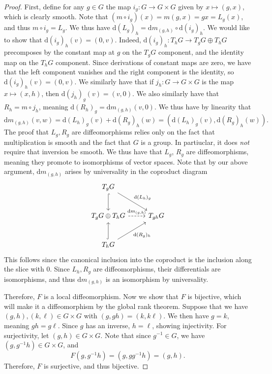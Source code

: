 \documentclass[11pt, letterpaper]{article}
\theoremstyle{plain}
\begin{document}
\begin{proof}
	First, define for any $g\in G$ the map $i_g : G \to G\times G$ given by $x\mapsto (g,x)$, which is clearly smooth. Note that $(m\circ i_g)(x)=m(g,x)=gx=L_g(x)$, and thus $m\circ i_g=L_g$. We thus have $\mathrm{d}(L_g)_h = \mathrm{d}m_{(g,h)} \circ \mathrm{d}(i_g)_h$. We would like to show that $\mathrm{d} (i_g)_h(v) = (0,v)$. Indeed, $\mathrm{d} (i_g)_h : T_hG \to T_gG\oplus T_hG$ precomposes by the constant map at $g$ on the $T_gG$ component, and the identity map on the $T_hG$ component. Since derivations of constant maps are zero, we have that the left component vanishes and the right component is the identity, so $\mathrm{d} (i_g)_h(v)=(0,v)$. We similarly have that if $j_h : G \to G\times G$ is the map $x\mapsto (x,h)$, then $\mathrm{d} (j_h)_g(v)=(v,0)$. We also similarly have that $R_h=m \circ j_h$, meaning $\mathrm{d} (R_h)_g=\mathrm{d} m_{(g,h)} (v,0)$. We thus have by linearity that
	\[
		\mathrm{d} m_{(g,h)} (v,w)=\mathrm{d} (L_h)_g(v)+\mathrm{d} (R_g)_h(w)=\left( \mathrm{d} (L_h)_g(v),\mathrm{d} (R_g)_h(w) \right) 
	.\]
	The proof that $L_g,R_g$ are diffeomorphisms relies only on the fact that multiplication is smooth and the fact that $G$ is a group. In partiuclar, it does \emph{not} require that inversion be smooth. We thus have that $L_g$, $R_g$ are diffeomorphisms, meaning they promote to isomorphisms of vector spaces. Note that by our above argument, $\mathrm{d} m_{(g,h)} $ arises by universality in the coproduct diagram
	\[\begin{tikzcd}[row sep = 2.5em, column sep = 2.5em]
	T_gG \ar[hook, d] \ar[" \mathrm{d} (L_h)_g ", dr]  &  \\
	T_gG \oplus T_hG \ar[" \mathrm{d} m_{(g\text{,}h)}  ", dashed, r]  & T_{gh} G \\
	T_hG \ar[hook, u] \ar[" \mathrm{d} (R_g)_h "', ur]  & 
	\end{tikzcd}\]
	This follows since the canonical inclusion into the coproduct is the inclusion along the slice with 0. Since $L_h,R_g$ are diffeomorphisms, their differentials are isomorphisms, and thus $\mathrm{d} m_{(g,h)} $ is an isomorphism by universality.

	Therefore, $F$ is a local diffeomorphism. Now we show that $F$ is bijective, which will make it a diffeomorphism by the global rank theorem. Suppose that we have $(g,h),(k,\ell )\in G\times G$ with $(g,gh)=(k,k\ell )$. We then have $g=k$, meaning $gh=g\ell $. Since $g$ has an inverse, $h=\ell $, showing injectivity. For surjectivity, let $(g,h)\in G\times G$. Note that since $g^{-1} \in G$, we have $(g,g^{-1} h)\in G\times G$, and
	\[
		F(g,g^{-1} h)=(g,gg^{-1} h)=(g,h)
	.\]
	Therefore, $F$ is surjective, and thus bijective.


\end{proof}
\end{document}
